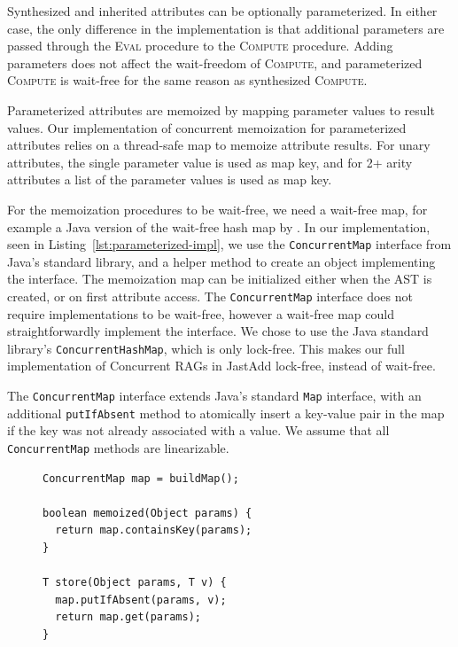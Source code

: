 {Synthesized and inherited attributes can be optionally parameterized.
In either case, the only difference in the implementation is that additional
parameters are passed through the \textsc{Eval} procedure to the \textsc{Compute} procedure.
Adding parameters does not affect the wait-freedom of \textsc{Compute}, and
parameterized \textsc{Compute} is wait-free for the same reason as synthesized \textsc{Compute}.

Parameterized attributes are memoized by mapping parameter values to result values.
Our implementation of concurrent memoization for parameterized attributes relies on
a thread-safe map to memoize attribute results.
For unary attributes, the single parameter value is used as map key, and
for 2+ arity attributes a list of the parameter values is used as map key.

For the memoization procedures to be wait-free, we need a wait-free map, for example
a Java version of the wait-free hash map by \textcite{DBLP:conf/searis/LangeWZ16}.
In our implementation, seen in Listing~\ref{lst:parameterized-impl},
we use the \verb'ConcurrentMap' interface from Java's standard library,
and a helper method to create an object implementing the interface. The
memoization map can be initialized either when the AST is created, or on first attribute access.
The \verb'ConcurrentMap' interface does not require implementations to be wait-free,
however a wait-free map could straightforwardly implement the interface.
We chose to use the Java standard library's \verb'ConcurrentHashMap', which is only
lock-free.  This makes our full implementation of Concurrent RAGs in JastAdd lock-free,
instead of wait-free.

The \verb'ConcurrentMap' interface extends Java's standard \verb'Map' interface, with an
additional \texttt{putIfAbsent} method to atomically insert a key-value pair in the
map if the key was not already associated with a value.
We assume that all \verb'ConcurrentMap' methods are linearizable.

\begin{figure}
\begin{minipage}[b]{.45\textwidth}
\begin{lstlisting}[basicstyle=\footnotesize\ttfamily,
  label={lst:parameterized-impl},
  caption={Memoization in Java for parameterized attributes.}]
ConcurrentMap map = buildMap();

boolean memoized(Object params) {
  return map.containsKey(params);
}

T store(Object params, T v) {
  map.putIfAbsent(params, v);
  return map.get(params);
}


\end{lstlisting}
\end{minipage}
\end{figure}}
